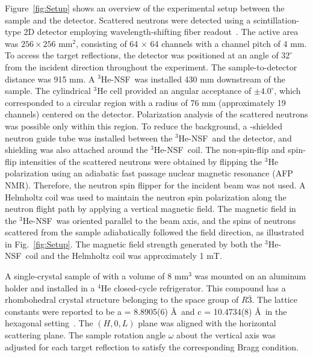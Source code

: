\documentclass[%
 reprint,
superscriptaddress,
 amsmath,amssymb,
 aps,
floatfix,
]{revtex4-2}
\newcommand{\He}{$^3$He }
\newcommand{\Hensf}{$^3$He-NSF}
\begin{document}
Figure~\ref{fig:Setup} shows an overview of the experimental setup between the sample and the detector.
Scattered neutrons were detected using a scintillation-type 2D detector employing wavelength-shifting fiber readout~\cite{nakamura_large-area_2012, noauthor_compact_nodate}.
The active area was $256 \times 256$ mm$^2$, consisting of 64 $\times$ 64 channels with a channel pitch of 4 mm.
To access the target reflections, the detector was positioned at an angle of $32^\circ$ from the incident direction throughout the experiment.
The sample-to-detector distance was 915 mm.
A \Hensf~was installed 430 mm downstream of the sample.
The cylindrical \He cell provided an angular acceptance of $\pm4.0^\circ$, which corresponded to a circular region with a radius of 76 mm (approximately 19 channels) centered on the detector.
Polarization analysis of the scattered neutrons was possible only within this region.
To reduce the background, a -shielded neutron guide tube was installed between the \Hensf~and the detector, and  shielding was also attached around the \Hensf~coil.
The non-spin-flip and spin-flip intensities of the scattered neutrons were obtained by flipping the \He polarization using an adiabatic fast passage nuclear magnetic resonance (AFP NMR).
Therefore, the neutron spin flipper for the incident beam was not used.
A Helmholtz coil was used to maintain the neutron spin polarization along the neutron flight path by applying a vertical magnetic field.
The magnetic field in the \Hensf~was oriented parallel to the beam axis, and the spins of neutrons scattered from the sample adiabatically followed the field direction, as illustrated in Fig.~\ref{fig:Setup}.
The magnetic field strength generated by both the \Hensf~coil and the Helmholtz coil was approximately 1 mT.

A single-crystal sample of  with a volume of 8 mm$^3$ was mounted on an aluminum holder and installed in a $^4$He closed-cycle refrigerator.
This compound has a rhombohedral crystal structure belonging to the space group of $R\bar{3}$. %
The lattice constants were reported to be a = 8.8905(6) \AA~and c = 10.4734(8) \AA~in the hexagonal setting~\cite{maignan_spin-induced_2020}.
The $(H,0,L)$ plane was aligned with the horizontal scattering plane.
The sample rotation angle $\omega$ about the vertical axis was adjusted for each target reflection to satisfy the corresponding Bragg condition.
\end{document}
